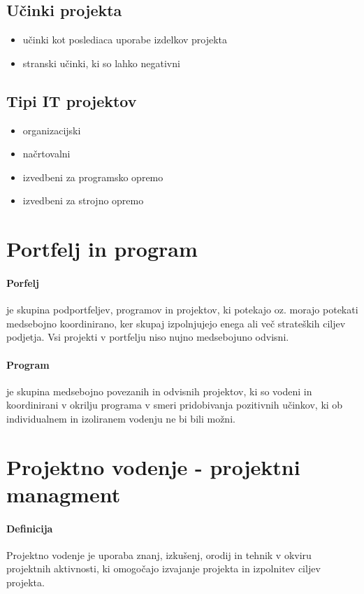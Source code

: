 \documentclass[a4paper,12pt]{report}
\begin{document}
      \subsection{Učinki projekta}
         \begin{itemize}
            \item učinki kot poslediaca uporabe izdelkov projekta
            \item stranski učinki, ki so lahko negativni
         \end{itemize}
      \subsection{Tipi IT projektov}
         \begin{itemize}
            \item organizacijski
            \item načrtovalni
            \item izvedbeni za programsko opremo
            \item izvedbeni za strojno opremo
         \end{itemize}
   \section{Portfelj in program}
         \paragraph{Porfelj} je skupina podportfeljev, programov in projektov, ki potekajo oz. morajo potekati medsebojno koordinirano, ker skupaj izpolnjujejo enega ali več strateških ciljev podjetja. Vsi projekti v portfelju niso nujno medsebojuno odvisni.
         \paragraph{Program} je skupina medsebojno povezanih in odvisnih projektov, ki so vodeni in koordinirani v okrilju programa v smeri pridobivanja pozitivnih učinkov, ki ob individualnem in izoliranem vodenju ne bi bili možni.

   \section{Projektno vodenje - projektni managment}
      \paragraph{Definicija} Projektno vodenje je uporaba znanj, izkušenj, orodij in tehnik v okviru projektnih aktivnosti, ki omogočajo izvajanje projekta in izpolnitev ciljev projekta.
\end{document}
